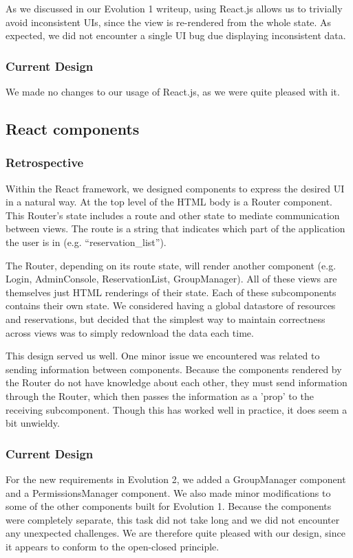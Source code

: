 \documentclass[12pt]{article}
\begin{document}
As we discussed in our Evolution 1 writeup, using React.js allows us to trivially avoid inconsistent UIs, since the view is re-rendered from the whole state. As expected, we did not encounter a single UI bug due displaying inconsistent data.

\subsubsection{Current Design}
We made no changes to our usage of React.js, as we were quite pleased with it.

\subsection{React components}
\subsubsection{Retrospective}
Within the React framework, we designed components to express the desired UI in a natural way. At the top level of the HTML body is a Router component. This Router's state includes a route and other state to mediate communication between views. The route is a string that indicates which part of the application the user is in (e.g. ``reservation\_list'').

The Router, depending on its route state, will render another component (e.g. Login, AdminConsole, ReservationList, GroupManager). All of these views are themselves just HTML renderings of their state. Each of these subcomponents contains their own state. We considered having a global datastore of resources and reservations, but decided that the simplest way to maintain correctness across views was to simply redownload the data each time.

This design served us well. One minor issue we encountered was related to sending information between components. Because the components rendered by the Router do not have knowledge about each other, they must send information through the Router, which then passes the information as a 'prop' to the receiving subcomponent. Though this has worked well in practice, it does seem a bit unwieldy.

\subsubsection{Current Design}
For the new requirements in Evolution 2, we added a GroupManager component and a PermissionsManager component. We also made minor modifications to some of the other components built for Evolution 1. Because the components were completely separate, this task did not take long and we did not encounter any unexpected challenges. We are therefore quite pleased with our design, since it appears to conform to the open-closed principle.
\end{document}
